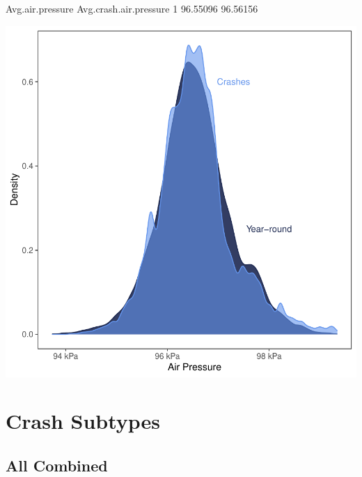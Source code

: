 \documentclass[11pt, a4paper]{article}
\begin{document}
\begin{Schunk}
\begin{Soutput}
  Avg.air.pressure Avg.crash.air.pressure
1         96.55096               96.56156
\end{Soutput}
\end{Schunk}
\includegraphics{variableinvestigation-019}








\pagebreak
\section{Crash Subtypes}

\subsection{All Combined}
\end{document}
